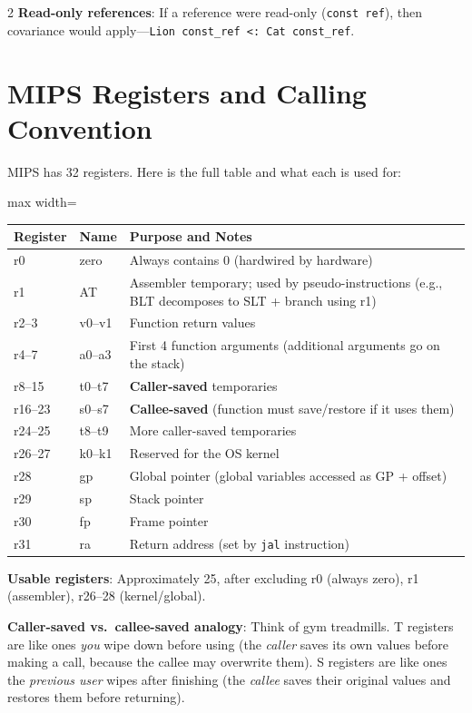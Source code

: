 \documentclass[9pt,landscape]{extarticle}
\begin{document}
\begin{multicols}{2}
\textbf{Read-only references}: If a reference were read-only (\texttt{const ref}), then covariance would apply---\texttt{Lion const\_ref <: Cat const\_ref}.

\section{MIPS Registers and Calling Convention}

MIPS has 32 registers. Here is the full table and what each is used for:

\begin{adjustbox}{max width=\columnwidth}
\begin{tabular}{@{}lll@{}}
\toprule
\textbf{Register} & \textbf{Name} & \textbf{Purpose and Notes} \\
\midrule
r0 & zero & Always contains 0 (hardwired by hardware) \\
r1 & AT & Assembler temporary; used by pseudo-instructions (e.g., BLT decomposes to SLT + branch using r1) \\
r2--3 & v0--v1 & Function return values \\
r4--7 & a0--a3 & First 4 function arguments (additional arguments go on the stack) \\
r8--15 & t0--t7 & \textbf{Caller-saved} temporaries \\
r16--23 & s0--s7 & \textbf{Callee-saved} (function must save/restore if it uses them) \\
r24--25 & t8--t9 & More caller-saved temporaries \\
r26--27 & k0--k1 & Reserved for the OS kernel \\
r28 & gp & Global pointer (global variables accessed as GP + offset) \\
r29 & sp & Stack pointer \\
r30 & fp & Frame pointer \\
r31 & ra & Return address (set by \texttt{jal} instruction) \\
\bottomrule
\end{tabular}
\end{adjustbox}

\textbf{Usable registers}: Approximately 25, after excluding r0 (always zero), r1 (assembler), r26--28 (kernel/global).

\textbf{Caller-saved vs.\ callee-saved analogy}: Think of gym treadmills. T registers are like ones \emph{you} wipe down before using (the \emph{caller} saves its own values before making a call, because the callee may overwrite them). S registers are like ones the \emph{previous user} wipes after finishing (the \emph{callee} saves their original values and restores them before returning).


\end{multicols}
\end{document}
